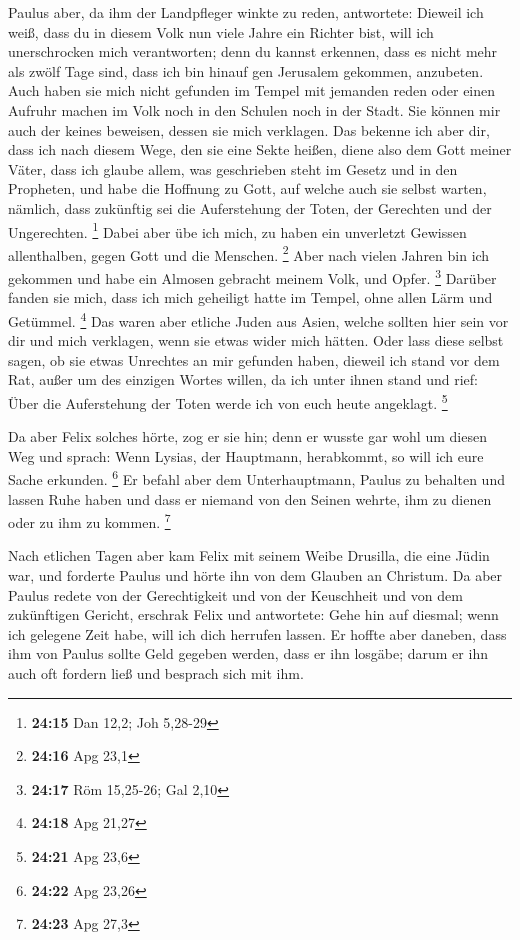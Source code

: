  Paulus aber, da ihm der Landpfleger winkte zu reden,
antwortete: Dieweil ich weiß, dass du in diesem Volk nun viele Jahre ein
Richter bist, will ich unerschrocken mich verantworten; 
denn du kannst erkennen, dass es nicht mehr als zwölf Tage sind, dass
ich bin hinauf gen Jerusalem gekommen, anzubeten.  Auch
haben sie mich nicht gefunden im Tempel mit jemanden reden oder einen
Aufruhr machen im Volk noch in den Schulen noch in der Stadt.
 Sie können mir auch der keines beweisen, dessen sie mich
verklagen.  Das bekenne ich aber dir, dass ich nach
diesem Wege, den sie eine Sekte heißen, diene also dem Gott meiner
Väter, dass ich glaube allem, was geschrieben steht im Gesetz und in den
Propheten,  und habe die Hoffnung zu Gott, auf welche
auch sie selbst warten, nämlich, dass zukünftig sei die Auferstehung der
Toten, der Gerechten und der Ungerechten. \footnote{\textbf{24:15} Dan
  12,2; Joh 5,28-29}  Dabei aber übe ich mich, zu haben
ein unverletzt Gewissen allenthalben, gegen Gott und die Menschen.
\footnote{\textbf{24:16} Apg 23,1}  Aber nach vielen
Jahren bin ich gekommen und habe ein Almosen gebracht meinem Volk, und
Opfer. \footnote{\textbf{24:17} Röm 15,25-26; Gal 2,10} 
Darüber fanden sie mich, dass ich mich geheiligt hatte im Tempel, ohne
allen Lärm und Getümmel. \footnote{\textbf{24:18} Apg 21,27}
 Das waren aber etliche Juden aus Asien, welche sollten
hier sein vor dir und mich verklagen, wenn sie etwas wider mich hätten.
 Oder lass diese selbst sagen, ob sie etwas Unrechtes an
mir gefunden haben, dieweil ich stand vor dem Rat,  außer
um des einzigen Wortes willen, da ich unter ihnen stand und rief: Über
die Auferstehung der Toten werde ich von euch heute angeklagt.
\footnote{\textbf{24:21} Apg 23,6}

 Da aber Felix solches hörte, zog er sie hin; denn er
wusste gar wohl um diesen Weg und sprach: Wenn Lysias, der Hauptmann,
herabkommt, so will ich eure Sache erkunden. \footnote{\textbf{24:22}
  Apg 23,26}  Er befahl aber dem Unterhauptmann, Paulus
zu behalten und lassen Ruhe haben und dass er niemand von den Seinen
wehrte, ihm zu dienen oder zu ihm zu kommen. \footnote{\textbf{24:23}
  Apg 27,3}

 Nach etlichen Tagen aber kam Felix mit seinem Weibe
Drusilla, die eine Jüdin war, und forderte Paulus und hörte ihn von dem
Glauben an Christum.  Da aber Paulus redete von der
Gerechtigkeit und von der Keuschheit und von dem zukünftigen Gericht,
erschrak Felix und antwortete: Gehe hin auf diesmal; wenn ich gelegene
Zeit habe, will ich dich herrufen lassen.  Er hoffte aber
daneben, dass ihm von Paulus sollte Geld gegeben werden, dass er ihn
losgäbe; darum er ihn auch oft fordern ließ und besprach sich mit ihm.

